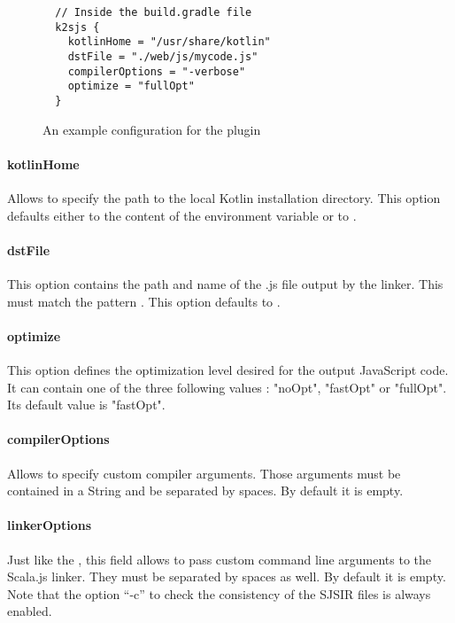 \begin{figure}[h]
\begin{verbatim}
  // Inside the build.gradle file
  k2sjs {
    kotlinHome = "/usr/share/kotlin"
    dstFile = "./web/js/mycode.js"
    compilerOptions = "-verbose"
    optimize = "fullOpt"
  }
\end{verbatim}
  \caption{An example configuration for the  plugin}
  \label{plugin_example_config}
\end{figure}

\paragraph{kotlinHome} Allows to specify the path to the local Kotlin installation directory. This 
option defaults either to the content of the environment variable 
 or to . 

\paragraph{dstFile} This option contains the path and name of the .js file output by the linker. 
This must match the pattern . This option defaults to 
.

\paragraph{optimize} This option defines the optimization level desired for the output JavaScript 
code. It can contain one of the three following values : "noOpt", "fastOpt" or "fullOpt". Its 
default value is "fastOpt".

\paragraph{compilerOptions} Allows to specify custom compiler arguments. Those arguments must be 
contained in a String and be separated by spaces. By default it is empty.

\paragraph{linkerOptions} Just like the , this field allows to pass 
custom command line arguments to the Scala.js linker. They must be separated by spaces as well. By 
default it is empty. Note that the option \enquote{-c} to check the consistency of the SJSIR files 
is always enabled.


